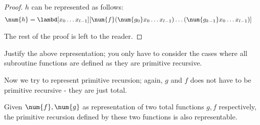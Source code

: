 \documentclass[../../../include/open-logic-section]{subfiles}
\begin{document}
\begin{proof}
  $h$ can be represented as follows:
  \begin{align}
    \num{h} &= \lambd[x_0 \dots x_{l-1}][\num{f} (\num{g_0} x_0 \dots
              x_{l-1}) \dots (\num{g_{k-1}} x_0 \dots x_{l-1})]
  \end{align}

  The rest of the proof is left to the reader.
\end{proof}

\begin{prob}
  Justify the above representation; you only have to consider the
  cases where all subroutine functions are defined as they are primitive
  recursive.
\end{prob}

Now we try to represent primitive recursion; again,
$g$ and $f$ does not have to be primitive recursive - they are just
total.
\begin{lem}
  Given $\num{f},\num{g}$ as representation of two total
  functions $g,f$ respectively, the primitive recursion defined by
  these two functions is also representable.
\end{lem}
\end{document}
